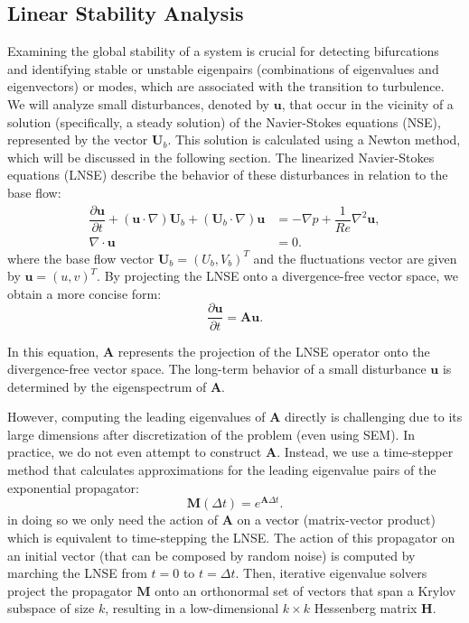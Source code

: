 \documentclass{article}
\begin{document}
\newpage
\subsection{Linear Stability Analysis}
Examining the global stability of a system is crucial for detecting bifurcations and identifying stable or unstable eigenpairs (combinations of eigenvalues and eigenvectors) or modes, which are associated with the transition to turbulence.
We will analyze small disturbances, denoted by $\mathbf{u}$, that occur in the vicinity of a solution (specifically, a steady solution) of the Navier-Stokes equations (NSE), represented by the vector $\mathbf{U}_b$. 
This solution is calculated using a Newton method, which will be discussed in the following section.
The linearized Navier-Stokes equations (LNSE) describe the behavior of these disturbances in relation to the base flow:
\begin{align}
\dfrac{\partial \mathbf{u}}{\partial t} + \left( \mathbf{u} \cdot \nabla \right) \mathbf{U}_b +\left( \mathbf{U}_b \cdot \nabla \right) \mathbf{u} &=
-\nabla p + \dfrac{1}{Re} \nabla^2 \mathbf{u},\\
\nabla \cdot \mathbf{u}&=0.
\end{align}
where the base flow vector $\mathbf{U}_b=(U_b,V_b)^T$ and the fluctuations vector are given by $\mathbf{u}=(u,v)^T$. 
By projecting the LNSE onto a divergence-free vector space, we obtain a more concise form:
\begin{equation*}
    \dfrac{\partial \mathbf{u}}{\partial t}=\mathbf{A}\mathbf{u}.
\end{equation*}

In this equation, $\mathbf{A}$ represents the projection of the LNSE operator onto the divergence-free vector space. The long-term behavior of a small disturbance $\mathbf{u}$ is determined by the eigenspectrum of $\mathbf{A}$.


However, computing the leading eigenvalues of $\mathbf{A}$ directly is challenging due to its large dimensions after discretization of the problem (even using SEM). In practice, we do not even attempt to construct $\mathbf{A}$. 
Instead, we use a time-stepper method that calculates approximations for the leading eigenvalue pairs of the exponential propagator:
\begin{equation*}
    \mathbf{M}(\Delta t)=e^{\mathbf{A}\Delta t}.
\end{equation*}
in doing so we only need the action of $\mathbf{A}$ on a vector (matrix-vector product) which is equivalent to time-stepping the LNSE. The action of this propagator on an initial vector (that can be composed by random noise) is computed by marching the LNSE from $t = 0$ to $t = \Delta t$.
Then, iterative eigenvalue solvers project the propagator $\mathbf{M}$ onto an orthonormal set of vectors that span a Krylov subspace of size $k$, resulting in a low-dimensional $k \times k$ Hessenberg matrix $\mathbf{H}$.
\end{document}
